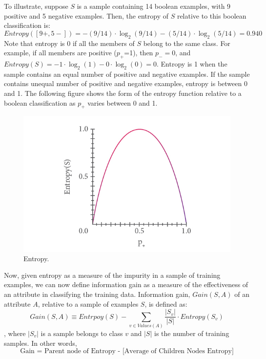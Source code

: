 To illustrate, suppose $S$ is a sample containing 14 boolean examples, with 9 positive and 5 negative examples. Then, the entropy of $S$ relative to this boolean classification is:
$$Entropy([9+, 5-]) = -(9/14)\cdot \log_2(9/14) - (5/14)\cdot \log_2(5/14) = 0.940$$
Note that entropy is 0 if all the members of $S$ belong to the same class. For example, if all members are positive ($p_+$=1), then $p_-=0$, and $Entropy(S) = -1\cdot \log_2(1) -0\cdot \log_2(0) = 0$. Entropy is 1 when the sample contains an equal number of positive and negative examples. If the sample contains unequal number of positive and negative examples, entropy is between 0 and 1. The following figure shows the form of the entropy function relative to a boolean classification as $p_+$ varies between 0 and 1.

\begin{figure}[h]
    \centering
    \includegraphics[scale=.40]{./images/decision_tree/entropy.jpg}
    \caption{Entropy.}
    \label{fig:entropy}
\end{figure}

Now, given entropy as a measure of the impurity in a sample of training examples, we can now define information gain as a measure of the effectiveness of an attribute in classifying the training data. Information gain, $Gain (S, A)$ of an attribute $A$, relative to a sample of examples $S$, is defined as:
$$Gain(S, A) \equiv Entrpoy(S) - \sum_{v \in Values(A)} \frac{|S_v|}{|S|} \cdot Entropy(S_v)$$
, where $|S_v|$ is a sample belongs to class $v$ and $|S|$ is the number of training samples. In other words,
$$\textrm{Gain  = Parent node of Entropy - [Average of Children Nodes Entropy]}$$
